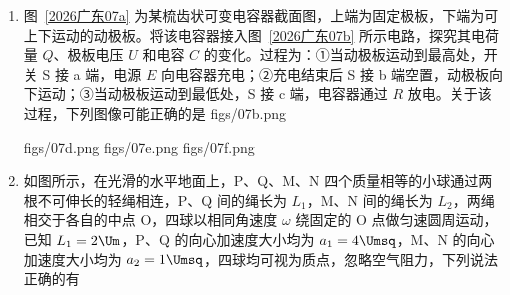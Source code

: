 \documentclass[\gkver]{gaokaozhenti}
\begin{document}
\begin{enumerate}
{又因为两卫星绕该行星做匀速圆周运动的周期之比 $T_{P}:T_{Q}$ 为 $8:1$，可得

$\frac{r_{P}^{3}}{r_{Q}^{3}}=\frac{T_{P}^{2}}{T_{Q}^{2}}=\left(\frac{8}{1}\right)^{2}=64$。

根据“引力差值”公式 $F=k\frac{MR}{r^{3}}$，其中 $M$ 和 $k$ 相同，所以 $\frac{F_{P}}{F_{Q}}=\frac{R_{P}}{R_{Q}}\cdot\frac{r_{Q}^{3}}{r_{P}^{3}}=\frac{2}{1}\times\frac{1}{64}=\frac{1}{32}$。

故选 C。
}

\item
图~\ref{2026广东07a} 为某梳齿状可变电容器截面图，上端为固定极板，下端为可上下运动的动极板。将该电容器接入图~\ref{2026广东07b} 所示电路，探究其电荷量 $Q$、极板电压 $U$ 和电容 $C$ 的变化。过程为：①当动极板运动到最高处，开关 S 接 a 端，电源 $E$ 向电容器充电；②充电结束后 S 接 b 端空置，动极板向下运动；③当动极板运动到最低处，S 接 c 端，电容器通过 $R$ 放电。关于该过程，下列图像可能正确的是 
{figs/07b.png}

{figs/07d.png}
{figs/07e.png}
{figs/07f.png}


\item
如图所示，在光滑的水平地面上，P、Q、M、N 四个质量相等的小球通过两根不可伸长的轻绳相连，P、Q 间的绳长为 $L_{1}$，M、N 间的绳长为 $L_{2}$，两绳相交于各自的中点 O，四球以相同角速度 $\omega$ 绕固定的 O 点做匀速圆周运动，已知 $L_{1}=2\Um$，P、Q 的向心加速度大小均为 $a_{1}=4\Umsq$，M、N 的向心加速度大小均为 $a_{2}=1\Umsq$，四球均可视为质点，忽略空气阻力，下列说法正确的有 


\end{enumerate}
\end{document}

